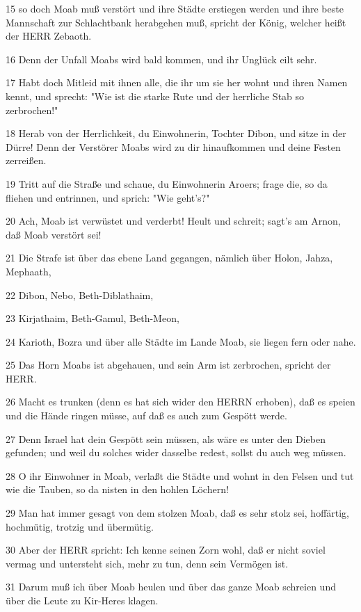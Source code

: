 \par 15 so doch Moab muß verstört und ihre Städte erstiegen werden und ihre beste Mannschaft zur Schlachtbank herabgehen muß, spricht der König, welcher heißt der HERR Zebaoth.
\par 16 Denn der Unfall Moabs wird bald kommen, und ihr Unglück eilt sehr.
\par 17 Habt doch Mitleid mit ihnen alle, die ihr um sie her wohnt und ihren Namen kennt, und sprecht: "Wie ist die starke Rute und der herrliche Stab so zerbrochen!"
\par 18 Herab von der Herrlichkeit, du Einwohnerin, Tochter Dibon, und sitze in der Dürre! Denn der Verstörer Moabs wird zu dir hinaufkommen und deine Festen zerreißen.
\par 19 Tritt auf die Straße und schaue, du Einwohnerin Aroers; frage die, so da fliehen und entrinnen, und sprich: "Wie geht's?"
\par 20 Ach, Moab ist verwüstet und verderbt! Heult und schreit; sagt's am Arnon, daß Moab verstört sei!
\par 21 Die Strafe ist über das ebene Land gegangen, nämlich über Holon, Jahza, Mephaath,
\par 22 Dibon, Nebo, Beth-Diblathaim,
\par 23 Kirjathaim, Beth-Gamul, Beth-Meon,
\par 24 Karioth, Bozra und über alle Städte im Lande Moab, sie liegen fern oder nahe.
\par 25 Das Horn Moabs ist abgehauen, und sein Arm ist zerbrochen, spricht der HERR.
\par 26 Macht es trunken (denn es hat sich wider den HERRN erhoben), daß es speien und die Hände ringen müsse, auf daß es auch zum Gespött werde.
\par 27 Denn Israel hat dein Gespött sein müssen, als wäre es unter den Dieben gefunden; und weil du solches wider dasselbe redest, sollst du auch weg müssen.
\par 28 O ihr Einwohner in Moab, verlaßt die Städte und wohnt in den Felsen und tut wie die Tauben, so da nisten in den hohlen Löchern!
\par 29 Man hat immer gesagt von dem stolzen Moab, daß es sehr stolz sei, hoffärtig, hochmütig, trotzig und übermütig.
\par 30 Aber der HERR spricht: Ich kenne seinen Zorn wohl, daß er nicht soviel vermag und untersteht sich, mehr zu tun, denn sein Vermögen ist.
\par 31 Darum muß ich über Moab heulen und über das ganze Moab schreien und über die Leute zu Kir-Heres klagen.
